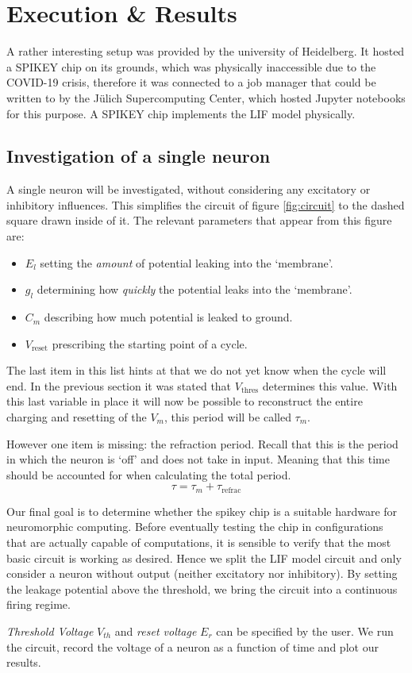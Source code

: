 \documentclass[a4paper,twocolumn]{article}
\begin{document}
\section{Execution \& Results}
A rather interesting setup was provided by the university of Heidelberg. It
hosted a SPIKEY chip on its grounds, which was physically inaccessible due to
the COVID-19 crisis, therefore it was connected to a job manager that could be
written to by the Jülich Supercomputing Center, which hosted Jupyter notebooks
for this purpose. A SPIKEY chip implements the LIF model physically.

\subsection{Investigation of a single neuron}
A single neuron will be investigated, without considering any excitatory or
inhibitory influences. This simplifies the circuit of figure \ref{fig:circuit}
to the dashed square drawn inside of it. The relevant parameters
that appear from this figure are:

\begin{itemize}
    \item $E_l$ setting the \textit{amount} of potential leaking into the `membrane'.
    \item $g_l$ determining how \textit{quickly} the potential leaks into the `membrane'.
    \item $C_m$ describing how much potential is leaked to ground.
    \item $V_\text{reset}$ prescribing the starting point of a cycle.
\end{itemize}

The last item in this list hints at that we do not yet know when the cycle will
end. In the previous section it was stated that $V_\text{thres}$ determines
this value. With this last variable in place it will now be possible to
reconstruct the entire charging and resetting of the $V_m$, this period will be
called $\tau_m$.

However one item is missing: the refraction period. Recall that this is the
period in which the neuron is `off' and does not take in input. Meaning that
this time should be accounted for when calculating the total period.
\begin{equation}
    \tau = \tau_m + \tau_\text{refrac}
    \label{eq:tau}
\end{equation}

Our final goal is to determine whether the spikey chip is a suitable hardware for
neuromorphic computing.  Before eventually testing the chip in configurations
that are actually capable of computations,  it is sensible to verify that the
most basic circuit is working as desired.  Hence we split the LIF model circuit
and only consider a neuron without output (neither excitatory nor inhibitory).
By setting the leakage potential above the threshold, we bring the circuit into
a continuous firing regime. \par
\textit{Threshold Voltage} $V_{th}$ and \textit{reset voltage} $E_r$ can be
specified by the user.  We run the circuit,  record the voltage of a neuron as
a function of time and plot our results.
\end{document}
